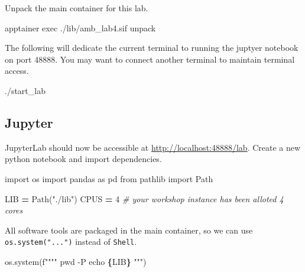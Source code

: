\documentclass[
]{book}
\newenvironment{Shaded}{\begin{snugshade}}{\end{snugshade}}
\newcommand{\CommentTok}[1]{\textcolor[rgb]{0.56,0.35,0.01}{\textit{#1}}}
\newcommand{\DecValTok}[1]{\textcolor[rgb]{0.00,0.00,0.81}{#1}}
\newcommand{\ExtensionTok}[1]{#1}
\newcommand{\ImportTok}[1]{#1}
\newcommand{\NormalTok}[1]{#1}
\newcommand{\OperatorTok}[1]{\textcolor[rgb]{0.81,0.36,0.00}{\textbf{#1}}}
\newcommand{\SpecialCharTok}[1]{\textcolor[rgb]{0.81,0.36,0.00}{\textbf{#1}}}
\newcommand{\SpecialStringTok}[1]{\textcolor[rgb]{0.31,0.60,0.02}{#1}}
\newcommand{\StringTok}[1]{\textcolor[rgb]{0.31,0.60,0.02}{#1}}
\begin{document}
Unpack the main container for this lab.

\begin{Shaded}
\begin{Highlighting}[]
\ExtensionTok{apptainer}\NormalTok{ exec ./lib/amb\_lab4.sif unpack}
\end{Highlighting}
\end{Shaded}

The following will dedicate the current terminal to running the juptyer notebook on port 48888.
You may want to connect another terminal to maintain terminal access.

\begin{Shaded}
\begin{Highlighting}[]
\ExtensionTok{./start\_lab}
\end{Highlighting}
\end{Shaded}

\subsection{Jupyter}\label{jupyter-1}

JupyterLab should now be accessible at \url{http://localhost:48888/lab}. Create a new python notebook and import dependencies.

\begin{Shaded}
\begin{Highlighting}[numbers=left,,]
\ImportTok{import}\NormalTok{ os}
\ImportTok{import}\NormalTok{ pandas }\ImportTok{as}\NormalTok{ pd}
\ImportTok{from}\NormalTok{ pathlib }\ImportTok{import}\NormalTok{ Path}

\NormalTok{LIB }\OperatorTok{=}\NormalTok{ Path(}\StringTok{"./lib"}\NormalTok{)}
\NormalTok{CPUS }\OperatorTok{=} \DecValTok{4} \CommentTok{\# your workshop instance has been alloted 4 cores}
\end{Highlighting}
\end{Shaded}

All software tools are packaged in the main container, so we can use \texttt{os.system("...")} instead of \texttt{Shell}.

\begin{Shaded}
\begin{Highlighting}[numbers=left,,]
\NormalTok{os.system(}\SpecialStringTok{f""""}
\SpecialStringTok{pwd {-}P}
\SpecialStringTok{echo }\SpecialCharTok{\{}\NormalTok{LIB}\SpecialCharTok{\}}
\SpecialStringTok{"""}\NormalTok{)}
\end{Highlighting}
\end{Shaded}
\end{document}
